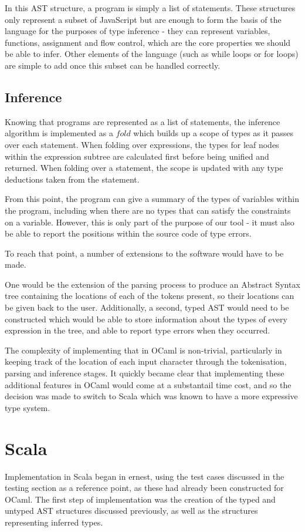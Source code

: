 \documentclass[british, twoside]{bhamthesis}
\theoremstyle{definition}
\begin{document}
      In this AST structure, a program is simply a list of statements. These structures only represent a subset of JavaScript but are enough to form the basis of the language for the purposes of type inference - they can represent variables, functions, assignment and flow control, which are the core properties we should be able to infer. Other elements of the language (such as while loops or for loops) are simple to add once this subset can be handled correctly.

    \subsection{Inference}
      Knowing that programs are represented as a list of statements, the inference algorithm is implemented as a $fold$ which builds up a scope of types as it passes over each statement. When folding over expressions, the types for leaf nodes within the expression subtree are calculated first before being unified and returned. When folding over a statement, the scope is updated with any type deductions taken from the statement.

      From this point, the program can give a summary of the types of variables within the program, including when there are no types that can satisfy the constraints on a variable. However, this is only part of the purpose of our tool - it must also be able to report the positions within the source code of type errors.

      To reach that point, a number of extensions to the software would have to be made.

      One would be the extension of the parsing process to produce an Abstract Syntax tree containing the locations of each of the tokens present, so their locations can be given back to the user. Additionally, a second, typed AST would need to be constructed which would be able to store information about the types of every expression in the tree, and able to report type errors when they occurred.

      The complexity of implementing that in OCaml is non-trivial, particularly in keeping track of the location of each input character through the tokenisation, parsing and inference stages. It quickly became clear that implementing these additional features in OCaml would come at a substantail time cost, and so the decision was made to switch to Scala which was known to have a more expressive type system.

  \section{Scala}
    Implementation in Scala began in ernest, using the test cases discussed in the testing section as a reference point, as these had already been constructed for OCaml. The first step of implementation was the creation of the typed and untyped AST structures discussed previously, as well as the structures representing inferred types.
\end{document}
